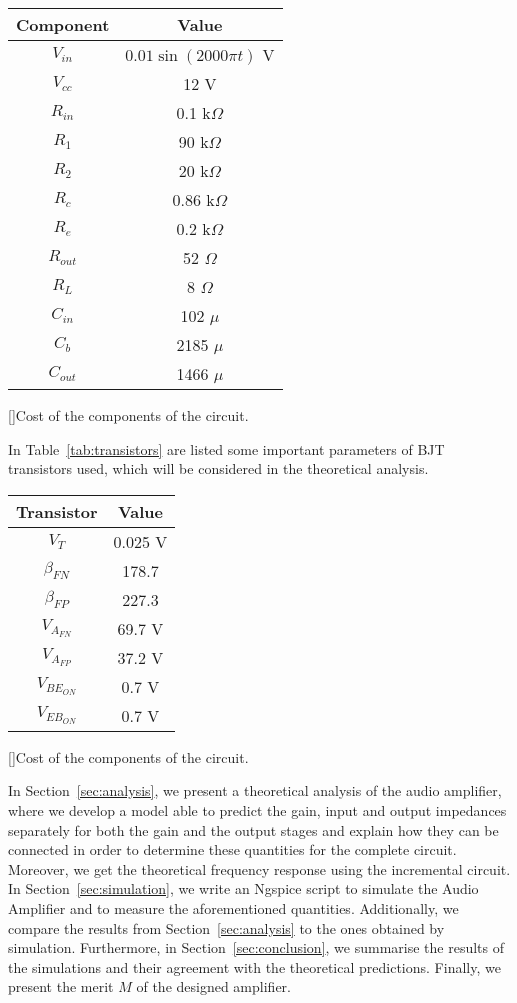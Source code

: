 \begin{center}
\begin{tabular}{ | c | c | }
\hline
\textbf{Component} & \textbf{Value} \\
\hline
$V_{in}$ & $0.01\sin{(2000\pi t)}$ V \\
\hline
$V_{cc}$ & 12 V \\
\hline
$R_{in}$ & 0.1 k$\Omega$ \\
\hline
$R_1$ & 90 k$\Omega$ \\
\hline
$R_2$ & 20 k$\Omega$ \\
\hline
$R_c$ & 0.86 k$\Omega$ \\
\hline
$R_e$ & 0.2 k$\Omega$ \\
\hline
$R_{out}$ & 52 $\Omega$ \\
\hline
$R_L$ & 8 $\Omega$ \\
\hline
$C_{in}$ & 102 $\mu$ \\
\hline
$C_b$ & 2185 $\mu$ \\
\hline
$C_{out}$ & 1466 $\mu$ \\
\hline
\end{tabular}\label{tab:components}
[]{Cost of the components of the circuit.}
\end{center}

In Table~\ref{tab:transistors} are listed some important parameters of BJT transistors used, which will be considered in the theoretical analysis.

\begin{center}
\begin{tabular}{ | c | c | }
\hline
\textbf{Transistor} & \textbf{Value}\\
\hline
$V_T$ & 0.025 V \\
\hline
$\beta_{FN}$ & 178.7 \\
\hline
$\beta_{FP}$ & 227.3 \\
\hline
$V_{A_{FN}}$ & 69.7 V \\
\hline
$V_{A_{FP}}$ & 37.2 V \\
\hline
$V_{{BE}_{ON}}$ & 0.7 V \\
\hline
$V_{{EB}_{ON}}$ & 0.7 V \\
\hline
\end{tabular}\label{tab:transistors}
[]{Cost of the components of the circuit.}
\end{center}

In Section~\ref{sec:analysis}, we present a theoretical analysis of the audio amplifier, where we develop a model able to predict the gain, input and output impedances separately for both the gain and the output stages and explain how they can be connected in order to determine these quantities for the complete circuit. Moreover, we get the theoretical frequency response using the incremental circuit. In Section~\ref{sec:simulation}, we write an Ngspice script to simulate the Audio Amplifier and to measure the aforementioned quantities. Additionally, we compare the results from Section~\ref{sec:analysis} to the ones obtained by simulation. Furthermore, in Section~\ref{sec:conclusion}, we summarise the results of the simulations and their agreement with the theoretical predictions. Finally, we present the merit $M$ of the designed amplifier.

